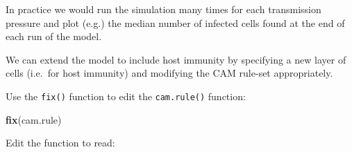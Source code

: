 \documentclass[12pt,a4paper]{book}
\newenvironment{Shaded}{\begin{snugshade}}{\end{snugshade}}
\newcommand{\ControlFlowTok}[1]{\textcolor[rgb]{0.13,0.29,0.53}{\textbf{#1}}}
\newcommand{\DataTypeTok}[1]{\textcolor[rgb]{0.13,0.29,0.53}{#1}}
\newcommand{\DecValTok}[1]{\textcolor[rgb]{0.00,0.00,0.81}{#1}}
\newcommand{\FloatTok}[1]{\textcolor[rgb]{0.00,0.00,0.81}{#1}}
\newcommand{\KeywordTok}[1]{\textcolor[rgb]{0.13,0.29,0.53}{\textbf{#1}}}
\newcommand{\NormalTok}[1]{#1}
\newcommand{\OperatorTok}[1]{\textcolor[rgb]{0.81,0.36,0.00}{\textbf{#1}}}
\newcommand{\StringTok}[1]{\textcolor[rgb]{0.31,0.60,0.02}{#1}}
\theoremstyle{definition}
\theoremstyle{definition}
\theoremstyle{definition}
\theoremstyle{remark}
\begin{document}
\begin{Shaded}
\end{Shaded}

In practice we would run the simulation many times for each transmission
pressure and plot (e.g.) the median number of infected cells found at
the end of each run of the model.

We can extend the model to include host immunity by specifying a new
layer of cells (i.e.~for host immunity) and modifying the CAM rule-set
appropriately.

Use the \texttt{fix()} function to edit the \texttt{cam.rule()}
function:

\begin{Shaded}
\begin{Highlighting}[]
\KeywordTok{fix}\NormalTok{(cam.rule)}
\end{Highlighting}
\end{Shaded}

Edit the function to read:
\end{document}
